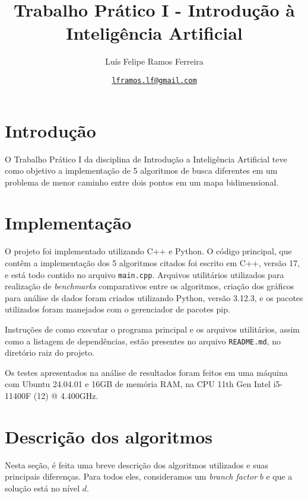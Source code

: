 \documentclass{article}
\title{Trabalho Prático I - Introdução à Inteligência Artificial}
\author{Luís Felipe Ramos Ferreira}
\date{\href{mailto:lframos.lf@gmail.com}{\texttt{lframos.lf@gmail.com}}
}
\begin{document}
\maketitle

\section{Introdução}

O Trabalho Prático I da disciplina de Introdução a Inteligência Artificial teve como objetivo a implementação de
5 algoritmos de busca diferentes em um problema de menor caminho entre dois pontos em um mapa bidimensional.

\section{Implementação}

O projeto foi implementado utilizando C++ e Python. O código principal, que contêm a implementação dos 5 algoritmos
citados foi escrito em C++, versão 17, e está todo contido no arquivo \texttt{main.cpp}. Arquivos utilitários utilizados para
realização de \textit{benchmarks} comparativos entre os algoritmos, criação dos gráficos para análise ds dados foram criados
utilizando Python, versão 3.12.3, e os pacotes utilizados foram manejados com o gerenciador de pacotes pip.

Instruções de como executar o programa principal e os arquivos utilitários, assim como a listagem de dependências, estão
presentes no arquivo \texttt{README.md}, no diretório raiz do projeto.

Os testes apresentados na análise de resultados foram feitos em uma máquina com Ubuntu 24.04.01 e 16GB de memória RAM, na CPU
11th Gen Intel i5-11400F (12) @ 4.400GHz.

\section{Descrição dos algoritmos}

Nesta seção, é feita uma breve descrição dos algoritmos utilizados e suas principais diferenças.
Para todos eles, consideramos um \textit{branch factor} \(b\) e
que a solução está no nível \(d\).
\end{document}

